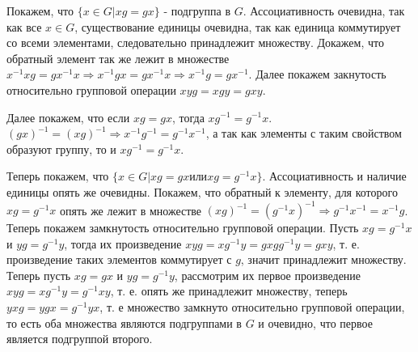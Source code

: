 \documentclass[a4paper,12pt]{article}
\begin{document}
\begin{Solution}
Покажем, что $\{x \in G | xg = gx\}$ - подгруппа в $G$. Ассоциативность очевидна, так как все $x \in G$, существование единицы очевидна, так как единица коммутирует со всеми элементами, следовательно принадлежит множеству. Докажем, что обратный элемент так же лежит в множестве $x^{-1}x g = g x^{-1}x \Rightarrow x^{-1} g x = g x^{-1} x \Rightarrow x^{-1} g = g x^{-1}$. Далее покажем закнутость относительно групповой операции $xyg = xgy = gxy$.

Далее покажем, что если $xg = gx$, тогда $xg^{-1} = g^{-1}x$. $(gx)^{-1} = (xg)^{-1} \Rightarrow x^{-1}g^{-1} = g^{-1}x^{-1}$, а так как элементы с таким свойством образуют группу, то и $x g^{-1} = g^{-1} x$.

Теперь покажем, что $\{x \in G | xg = gx \text{или} xg=g^{-1}x\}$. Ассоциативность и наличие единицы опять же очевидны. Покажем, что обратный к элементу, для которого $xg = g^{-1}x$ опять же лежит в множестве $(xg)^{-1} = (g^{-1}x)^{-1} \Rightarrow g^{-1}x^{-1} = x^{-1}g$. Теперь покажем замкнутость относительно групповой операции. Пусть $xg = g^{-1}x$ и $yg = g^{-1}y$, тогда их произведение $xyg = xg^{-1}y = gxgg^{-1}y = gxy$, т. е. произведение таких элементов коммутирует с $g$, значит принадлежит множеству. Теперь пусть $xg = gx$ и $yg = g^{-1}y$, рассмотрим их первое произведение $xyg = x g^{-1} y = g^{-1} xy$, т. е. опять же принадлежит множеству, теперь $yxg = ygx = g^{-1}yx$, т. е множество замкнуто относительно групповой операции, то есть оба множества являются подгруппами в $G$ и очевидно, что первое является подгруппой второго.
\end{Solution}
\end{document}
